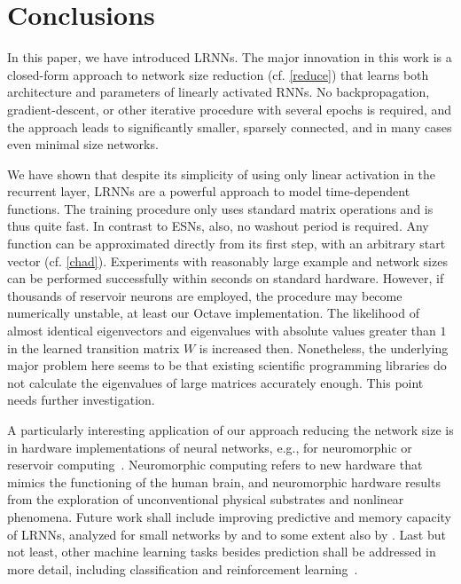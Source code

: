 \documentclass[preprint,12pt,times,authoryear]{elsarticle}%
\theoremstyle{definition}
\begin{document}
\section{Conclusions}\label{conclude}

In this paper, we have introduced LRNNs. The major innovation in this work is a
closed-form approach to network size reduction (cf.
\cref{reduce}) that learns both architecture and parameters of linearly activated RNNs.
No backpropagation, gradient-descent, or other iterative procedure with several
epochs is required, and the approach leads to significantly smaller, sparsely
connected, and in many cases even minimal size networks.

We have shown that despite its simplicity of using only linear activation in the
recurrent layer, LRNNs are a powerful approach to model time-dependent functions.
The training procedure only uses standard matrix operations and is thus quite fast.
In contrast to ESNs, also, no washout period is required. Any
function can be approximated directly from its first step, with an arbitrary
start vector (cf. \cref{chad}).
Experiments with reasonably large example and network sizes can be performed
successfully within seconds on standard hardware.
However, if thousands of reservoir neurons are employed, the procedure may
become numerically unstable, at least our Octave implementation. The likelihood
of almost identical eigenvectors and eigenvalues with absolute values greater
than $1$ in the learned transition matrix $W$ is increased then. Nonetheless,
the underlying major problem here seems to be that existing scientific
programming libraries do not calculate the eigenvalues of large matrices
accurately enough. This point needs further investigation.

A particularly interesting application of our approach reducing the network size
is in hardware implementations of neural networks, e.g., for neuromorphic or
reservoir computing~\citep{Mea90,IL+11,LL17}. Neuromorphic computing refers to
new hardware that mimics the functioning of the human brain, and neuromorphic
hardware results from the exploration of unconventional physical substrates
and nonlinear phenomena. Future work shall include improving predictive and
memory capacity of LRNNs, analyzed for small networks by \citet{Mar17} and to
some extent also by \citet{CW+16}. Last but not least, other machine learning tasks besides
prediction shall be addressed in more detail, including classification and
reinforcement learning~\citep{SB18,PGL17}.
\end{document}
